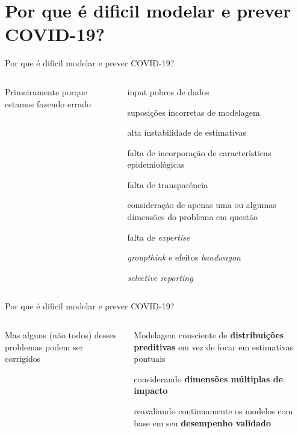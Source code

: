 \documentclass[aspectratio=169]{beamer}                    %
\begin{document}
\section{Por que é dificil modelar e prever COVID-19?}
\begin{frame}{Por que é dificil modelar e prever COVID-19?}
    \begin{columns}
        \begin{column}{0.3\textwidth}
            Primeiramente porque estamos fazendo errado \parencite{ioannidisForecastingCOVID19Has2020}
        \end{column}
        \begin{column}{0.7\textwidth}
            \begin{vfilleditems}
                \item input pobres de dados
                \item suposições incorretas de modelagem
                \item alta instabilidade de estimativas
                \item falta de incorporação de características epidemiológicas
                \item falta de transparência
                \item consideração de apenas uma ou algumas dimensões do problema em questão
                \item falta de \textit{expertise}
                \item \textit{groupthink} e efeitos \textit{bandwagon}
                \item \textit{selective reporting}
            \end{vfilleditems}
        \end{column}
    \end{columns}
\end{frame}

\begin{frame}{Por que é dificil modelar e prever COVID-19?}
    \begin{columns}
        \begin{column}{0.4\textwidth}
            Mas alguns (não todos) desses problemas podem ser corrigidos \parencite{ioannidisForecastingCOVID19Has2020}
        \end{column}
        \begin{column}{0.6\textwidth}
            \begin{vfilleditems}
                \item Modelagem consciente de \textbf{distribuições preditivas} em vez de focar em estimativas pontuais
                \item considerando \textbf{dimensões múltiplas de impacto}
                \item reavaliando continuamente os modelos com base em seu \textbf{desempenho validado}
            \end{vfilleditems}
        \end{column}
    \end{columns}
\end{frame}
\end{document}
